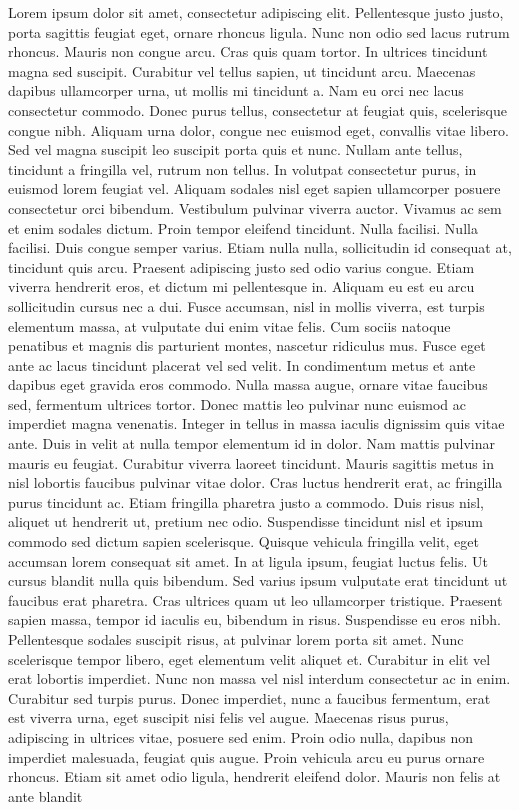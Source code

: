 \documentclass[letterpaper, twoside, 12pt,these,creativecommons,hyperref]{thETS}
\begin{document}
\begin{introduction}

Lorem ipsum dolor sit amet, consectetur adipiscing elit. Pellentesque justo justo, porta sagittis feugiat eget, ornare rhoncus ligula. Nunc non odio sed lacus rutrum rhoncus. Mauris non congue arcu. Cras quis quam tortor.  In ultrices tincidunt magna sed suscipit. Curabitur vel tellus sapien, ut tincidunt arcu. Maecenas dapibus ullamcorper urna, ut mollis mi tincidunt a. Nam eu orci nec lacus consectetur commodo. Donec purus tellus, consectetur at feugiat quis, scelerisque congue nibh. Aliquam urna dolor, congue nec euismod eget, convallis vitae libero. Sed vel magna suscipit leo suscipit porta quis et nunc. Nullam ante tellus, tincidunt a fringilla vel, rutrum non tellus. In volutpat consectetur purus, in euismod lorem feugiat vel. Aliquam sodales nisl eget sapien ullamcorper posuere consectetur orci bibendum. Vestibulum pulvinar viverra auctor. Vivamus ac sem et enim sodales dictum. Proin tempor eleifend tincidunt. Nulla facilisi. Nulla facilisi. Duis congue semper varius. Etiam nulla nulla, sollicitudin id consequat at, tincidunt quis arcu. Praesent adipiscing justo sed odio varius congue. Etiam viverra hendrerit eros, et dictum mi pellentesque in. Aliquam eu est eu arcu sollicitudin cursus nec a dui. Fusce accumsan, nisl in mollis viverra, est turpis elementum massa, at vulputate dui enim vitae felis. Cum sociis natoque penatibus et magnis dis parturient montes, nascetur ridiculus mus. Fusce eget ante ac lacus tincidunt placerat vel sed velit. In condimentum metus et ante dapibus eget gravida eros commodo. Nulla massa augue, ornare vitae faucibus sed, fermentum ultrices tortor. Donec mattis leo pulvinar nunc euismod ac imperdiet magna venenatis. Integer in tellus in massa iaculis dignissim quis vitae ante. Duis in velit at nulla tempor elementum id in dolor. Nam mattis pulvinar mauris eu feugiat. Curabitur viverra laoreet tincidunt. Mauris sagittis metus in nisl lobortis faucibus pulvinar vitae dolor. Cras luctus hendrerit erat, ac fringilla purus tincidunt ac. Etiam fringilla pharetra justo a commodo. Duis risus nisl, aliquet ut hendrerit ut, pretium nec odio. Suspendisse tincidunt nisl et ipsum commodo sed dictum sapien scelerisque. Quisque vehicula fringilla velit, eget accumsan lorem consequat sit amet. In at ligula ipsum, feugiat luctus felis. Ut cursus blandit nulla quis bibendum. Sed varius ipsum vulputate erat tincidunt ut faucibus erat pharetra. Cras ultrices quam ut leo ullamcorper tristique. Praesent sapien massa, tempor id iaculis eu, bibendum in risus. Suspendisse eu eros nibh. Pellentesque sodales suscipit risus, at pulvinar lorem porta sit amet. Nunc scelerisque tempor libero, eget elementum velit aliquet et. Curabitur in elit vel erat lobortis imperdiet. Nunc non massa vel nisl interdum consectetur ac in enim. Curabitur sed turpis purus. Donec imperdiet, nunc a faucibus fermentum, erat est viverra urna, eget suscipit nisi felis vel augue. Maecenas risus purus, adipiscing in ultrices vitae, posuere sed enim. Proin odio nulla, dapibus non imperdiet malesuada, feugiat quis augue. Proin vehicula arcu eu purus ornare rhoncus. Etiam sit amet odio ligula, hendrerit eleifend dolor. Mauris non felis at ante blandit 
\end{introduction}
\end{document}
